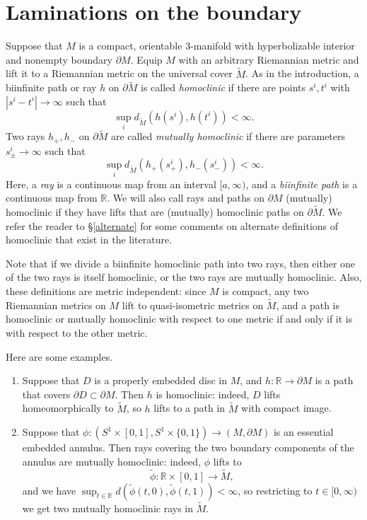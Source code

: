 \documentclass[12pt]{amsart}
\theoremstyle{definition}
\theoremstyle{remark}
\newcommand{\BR}{\mathbb R} \newcommand{\BD}{\mathbb D}
\begin{document}
\section{Laminations on the boundary}  \label{lamsec}
Suppose that $M $ is a compact, orientable $3$-manifold with hyperbolizable interior and nonempty boundary $\partial M$.  Equip $M$ with an arbitrary Riemannian metric  and lift it to  a Riemannian metric on the universal cover $\tilde M$.  As in the introduction, a biinfinite path or ray $h$ on $\partial \tilde M$ is called \emph{homoclinic} if there are points $s^i,t^i$  with $|s^i-t^i|\to \infty$ such that $$\sup_i d_{\tilde M} (h(s^i),h(t^i)) < \infty.$$ Two rays $h_+,h_- $ on $\partial \tilde M$ are called \emph{mutually homoclinic} if there are  parameters $s_\pm^i \to \infty$  such that $$\sup_i d_{\tilde M} (h_+(s_+^i),h_-(s_-^i)) < \infty.$$
 Here, a \emph{ray}  is a continuous map  from an interval $ [a,\infty) $, and a \emph{biinfinite path} is  a continuous map from $\BR$.  We will also call rays and paths on $\partial M$ (mutually) homoclinic if they have lifts that are (mutually) homoclinic paths on $\partial \tilde M$. We refer the reader to \S \ref{alternate} for some comments on alternate definitions of homoclinic that exist in the literature.

Note that if we divide a biinfinite homoclinic path  into two rays, then  either one of the two rays is  itself homoclinic, or  the two rays are mutually homoclinic.  Also,  these definitions are metric independent: since $M$ is compact, any two Riemannian metrics on $M$ lift to quasi-isometric metrics on $\tilde M$, and a path is homoclinic or mutually homoclinic with respect to one metric if and only if it is with respect to the other metric.


Here are some examples.

\begin{enumerate}
	\item  Suppose that $D$ is a  properly embedded disc in $M$, and $h : \BR \longrightarrow \partial M$ is a path that covers $\partial D\subset\partial M $. Then $h$ is homoclinic: indeed, $D$ lifts homeomorphically to $\tilde M$, so $h$ lifts to a path in $\tilde M$ with compact image.
\item Suppose that $\phi : (S^1 \times [0,1], S^1 \times \{0,1\}) \longrightarrow (M,\partial M)$  is an essential embedded annulus. Then rays covering the two boundary components of the annulus are mutually homoclinic: indeed, $\phi$ lifts to  $$\tilde \phi : \BR \times [0,1] \longrightarrow \tilde M ,$$ and we have $\sup_{t\in \BR} d(\tilde \phi(t,0), \tilde \phi(t,1)) < \infty$, so restricting to $t\in [0,\infty)$ we get two mutually homoclinic rays in $\tilde M$.\end{enumerate}
\end{document}
